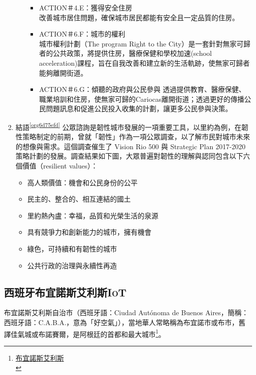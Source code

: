 \documentclass[a4paper,12pt]{article}
\begin{document}
\begin{enumerate}
\begin{enumerate}
\begin{itemize}
\item ACTION＃4.E：獲得安全住房\\
改善城市居住問題，確保城市居民都能有安全且一定品質的住房。\\
\item ACTION＃6.F：城市的權利\\
城市權利計劃（The program Right to the City）是一套針對無家可歸者的公共政策，將提供住房，醫療保健和學校加速(school acceleration)課程，旨在自我改善和建立新的生活軌跡，使無家可歸者能夠離開街道。\\
\item ACTION＃6.G：傾聽的政府與公民參與  透過提供教育、醫療保健、職業培訓和住房，使無家可歸的Cariocas離開街道；透過更好的傳播公民問題訊息和促進公民投入收集的計劃，讓更多公民參與決策。\\
\end{itemize}
\end{enumerate}
\item 結語\textsuperscript{\ref{org6d75efd}}
\label{sec:orgd0580cf}
公眾諮詢是韌性城市發展的一項重要工具，以里約為例，在韌性策略制定的前期，曾就「韌性」作為一項公眾調查，以了解市民對城市未來的想像與需求。這個調查催生了 Vision Rio 500 與 Strategic Plan 2017-2020 策略計劃的發展。調查結果如下圖，大眾普遍對韌性的理解與認同包含以下六個價值（resilient values）：\\
\begin{itemize}
\item 高人類價值：機會和公民身份的公平\\
\item 民主的、整合的、相互連結的國土\\
\item 里約熱內盧：幸福，品質和光榮生活的泉源\\
\item 具有競爭力和創新能力的城市，擁有機會\\
\item 綠色，可持續和有韌性的城市\\
\item 公共行政的治理與永續性再造\\
\end{itemize}
\end{enumerate}

\subsection{西班牙布宜諾斯艾利斯\hfill{}\textsc{IoT}}
\label{sec:org59b0678}
布宜諾斯艾利斯自治市（西班牙語：Ciudad Autónoma de Buenos Aires，簡稱：西班牙語：C.A.B.A.，意為「好空氣」），當地華人常略稱為布宜諾市或布市，舊譯佳氣城或布諾賽爾，是阿根廷的首都和最大城市\footnote{\href{https://zh.wikipedia.org/wiki/\%E5\%B8\%83\%E5\%AE\%9C\%E8\%AB\%BE\%E6\%96\%AF\%E8\%89\%BE\%E5\%88\%A9\%E6\%96\%AF}{布宜諾斯艾利斯}\\}。\\
\end{document}
